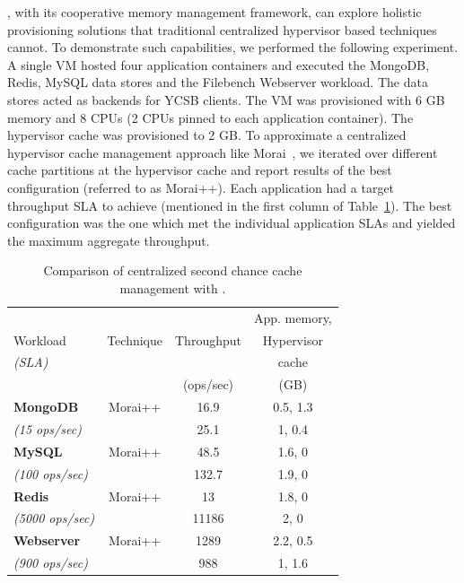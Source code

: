 %
\dd{}, with its cooperative memory management framework, can explore 
holistic provisioning solutions that traditional centralized hypervisor
based techniques cannot.
%
To demonstrate such capabilities, we performed the following experiment.
%
A single VM hosted four application containers and executed the 
MongoDB, Redis, MySQL data stores and the Filebench Webserver workload.
The data stores acted as backends for YCSB clients.
The VM was provisioned with 6 GB memory and 8 CPUs (2 CPUs pinned
to each application container).
%
The hypervisor cache was provisioned to 2 GB.
%
To approximate a centralized hypervisor cache management approach 
like Morai~\cite{sdc},
we iterated over different cache partitions at the hypervisor 
cache and report
results of the best configuration (referred to as Morai++).
%
Each application had a target throughput SLA to achieve (mentioned
in the first column of Table~\ref{table:ddsdc}). The best configuration
was the one which met the individual application SLAs and yielded
the maximum aggregate throughput.
%
% 
\begin{table}[t]
\small
\begin{center}
\begin{tabular}{|l|c|c|c|}
\hline
{}           & {} & {} & {App. memory,}\\
{ Workload}  & { Technique} &  Throughput{} & {Hypervisor} \\
{\em (SLA)} & & { } & {cache}  \\
& & { (ops/sec)} & {(GB)}  \\
\hline 
\hline 
{\bf MongoDB} & Morai++ & 16.9 & 0.5, 1.3 \\
{\em (15 ops/sec)} & \dd{}& 25.1 & 1, 0.4  \\
\hline
{\bf MySQL} & Morai++ & 48.5 & 1.6, 0 \\
{\em (100 ops/sec)} & \dd{} & 132.7 & 1.9, 0 \\
\hline
{\bf Redis} & Morai++ & 13 & 1.8, 0 \\
{\em (5000 ops/sec)} & \dd{} & 11186  & 2, 0 \\
\hline
{\bf Webserver} & Morai++ & 1289 & 2.2, 0.5 \\
{\em (900 ops/sec)} & \dd{} & 988 & 1, 1.6  \\
\hline 
\end{tabular}
\caption{Comparison of centralized second chance cache management with \dd{}.}
\vspace{-1cm}
\label{table:ddsdc}
\end{center}
\end{table}

